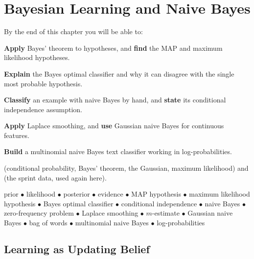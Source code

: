 \chapter{Bayesian Learning and Naive Bayes}\label{ch:bayes}

\begin{outcomes}
By the end of this chapter you will be able to:
\begin{tight}
  \item \textbf{Apply} Bayes' theorem to hypotheses, and \textbf{find} the MAP
        and maximum likelihood hypotheses.
  \item \textbf{Explain} the Bayes optimal classifier and why it can disagree
        with the single most probable hypothesis.
  \item \textbf{Classify} an example with naive Bayes by hand, and
        \textbf{state} its conditional independence assumption.
  \item \textbf{Apply} Laplace smoothing, and \textbf{use} Gaussian naive Bayes
        for continuous features.
  \item \textbf{Build} a multinomial naive Bayes text classifier working in
        log-probabilities.
\end{tight}
\end{outcomes}

\begin{prereq}
 (conditional probability, Bayes' theorem, the Gaussian, maximum
likelihood) and  (the sprint data, used again here).
\end{prereq}

\begin{keyterms}
prior $\bullet$ likelihood $\bullet$ posterior $\bullet$ evidence $\bullet$ MAP
hypothesis $\bullet$ maximum likelihood hypothesis $\bullet$ Bayes optimal
classifier $\bullet$ conditional independence $\bullet$ naive Bayes $\bullet$
zero-frequency problem $\bullet$ Laplace smoothing $\bullet$ $m$-estimate
$\bullet$ Gaussian naive Bayes $\bullet$ bag of words $\bullet$ multinomial naive
Bayes $\bullet$ log-probabilities
\end{keyterms}

\section{Learning as Updating Belief}

